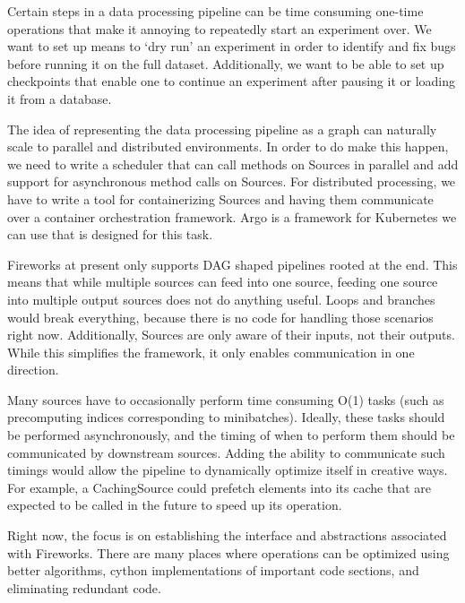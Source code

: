 \documentclass[letterpaper,10pt,english]{sphinxmanual}
\begin{document}

Certain steps in a data processing pipeline can be time consuming one-time operations that make it annoying to repeatedly start an experiment over. We want to set up means to ‘dry run’ an experiment in order to identify and fix bugs before running it on the full dataset. Additionally, we want to be able to set up checkpoints that enable one to continue an experiment after pausing it or loading it from a database.


The idea of representing the data processing pipeline as a graph can naturally scale to parallel and distributed environments. In order to do make this happen, we need to write a scheduler that can call methods on Sources in parallel and add support for asynchronous method calls on Sources. For distributed processing, we have to write a tool for containerizing Sources and having them communicate over a container orchestration framework. Argo is a framework for Kubernetes we can use that is designed for this task.


Fireworks at present only supports DAG shaped pipelines rooted at the end. This means that while multiple sources can feed into one source, feeding one source into multiple output sources does not do anything useful. Loops and branches would break everything, because there is no code for handling those scenarios right now. Additionally, Sources are only aware of their inputs, not their outputs. While this simplifies the framework, it only enables communication in one direction.


Many sources have to occasionally perform time consuming O(1) tasks (such as precomputing indices corresponding to minibatches). Ideally, these tasks should be performed asynchronously, and the timing of when to perform them should be communicated by downstream sources. Adding the ability to communicate such timings would allow the pipeline to dynamically optimize itself in creative ways. For example, a CachingSource could prefetch elements into its cache that are expected to be called in the future to speed up its operation.


Right now, the focus is on establishing the interface and abstractions associated with Fireworks. There are many places where operations can be optimized using better algorithms, cython implementations of important code sections, and eliminating redundant code.
\end{document}
